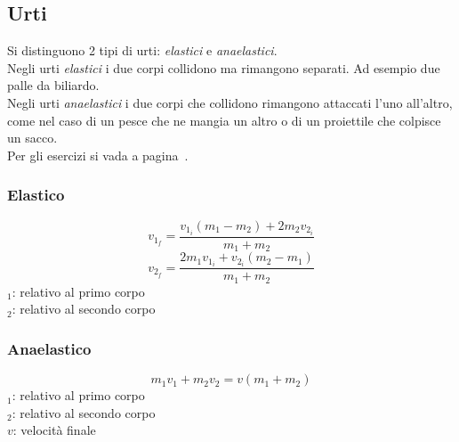 \subsection{Urti}\label{subsec:dinamica:urti}
Si distinguono 2 tipi di urti: \emph{elastici} e \emph{anaelastici}.\\[\baselineskip]
Negli urti \emph{elastici} i due corpi collidono ma rimangono separati. Ad esempio due palle
da biliardo.\\
Negli urti \emph{anaelastici} i due corpi che collidono rimangono attaccati l'uno all'altro,
come nel caso di un pesce che ne mangia un altro o di un proiettile che colpisce un sacco.\\

Per gli esercizi si vada a pagina~\pageref{ex:urti}.

\subsubsection{Elastico}
\begin{equation*}
  v_{1_f} = \frac{v_{1_i}\left(m_1-m_2\right) + 2m_2v_{2_i}}{m_1+m_2}
\end{equation*}
\begin{equation*}
  v_{2_f} = \frac{2m_1v_{1_i} + v_{2_i}\left(m_2-m_1\right)}{m_1+m_2}
\end{equation*}
$_1$: relativo al primo corpo\\
$_2$: relativo al secondo corpo

\subsubsection{Anaelastico}
\begin{equation*}
  m_1v_1 + m_2v_2 = v(m_1+m_2)
\end{equation*}
$_1$: relativo al primo corpo\\
$_2$: relativo al secondo corpo\\
$v$: velocità finale

